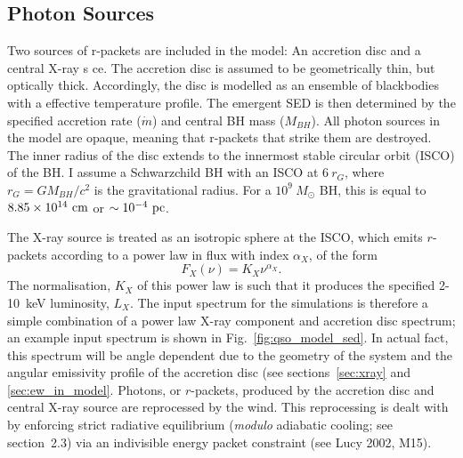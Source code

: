 \subsection{Photon Sources}
\label{sec:photon_sources}

Two sources of r-packets are included in the model:
An accretion disc and a central X-ray s ce.
The accretion disc is assumed to be geometrically thin, 
but optically thick.
Accordingly, the disc is modelled as an ensemble of blackbodies with a 
\cite{shakurasunyaev1973} effective temperature profile. 
The emergent SED is then determined by the specified accretion rate ($\dot{m}$)
and central BH mass ($M_{BH}$).
All photon sources in the model are opaque, meaning
that r-packets that strike them are destroyed.
The inner radius of the disc extends to the innermost 
stable circular orbit (ISCO) of the BH. 
I assume a Schwarzchild BH with an ISCO at $6~r_G$, where 
$r_G = GM_{BH}/c^2$ is the gravitational radius.
For a $10^9~M_\odot$ BH, this is equal to $8.85\times10^{14}~{\rm cm}$ 
or $\sim10^{-4}~{\rm pc}$.  


The X-ray source is treated as an isotropic sphere at the ISCO,
which emits $r$-packets according to a power law in flux with index $\alpha_X$, of the form
\begin{equation}
F_X (\nu) = K_X \nu^{\alpha_X}.
\end{equation}
The normalisation, $K_X$ of this power law is such that it 
produces the specified 2-10~keV luminosity, $L_X$.
The input spectrum for the simulations is therefore a simple combination
of a power law X-ray component and accretion disc spectrum; an example input
spectrum is shown in Fig.~\ref{fig:qso_model_sed}. In actual fact, this
spectrum will be angle dependent due to the geometry of the system and 
the angular emissivity profile of the accretion disc (see sections~\ref{sec:xray}
and \ref{sec:ew_in_model}.
Photons, or $r$-packets, produced by the accretion disc and central X-ray source
are reprocessed by the wind. This reprocessing is dealt with by enforcing strict
radiative equilibrium ({\em modulo} adiabatic cooling; see section~2.3)
via an indivisible energy packet constraint (see Lucy 2002, M15).  

